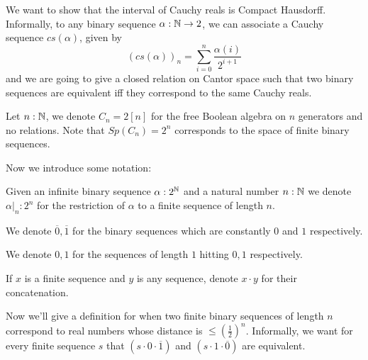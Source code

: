 We want to show that the interval of Cauchy reals is Compact Hausdorff. 
Informally, to any binary sequence $\alpha : \mathbb{N} \to 2$, 
we can associate a Cauchy sequence 
$cs(\alpha)$, given by 
\begin{equation}\label{eqnBinaryEncode}
  (cs(\alpha))_n = \sum\limits_{i = 0 }^n \frac {\alpha(i)}{2^{i+1}}
\end{equation}
and we are going to give a closed relation on Cantor space such that 
two binary sequences are equivalent iff they correspond to the same Cauchy reals. 
\begin{example}
  Let $n:\mathbb{N}$, we denote $C_n = 2[n]$ for the free Boolean algebra on $n$ generators 
  and no relations. 
  Note that $Sp(C_n) = 2^n$ corresponds to the space of finite binary sequences. 
\end{example}
Now we introduce some notation:
\begin{definition}
  \item Given an infinite binary sequence $\alpha:2^{\mathbb{N}}$ and a natural number $n : \mathbb{N}$  
    we denote $\alpha|_n: 2^n$ for the 
    restriction of $\alpha$ to a finite sequence of length $n$. 
  \item We denote $\overline 0, \overline 1$ 
    for the binary sequences which are constantly $0$ and $1$ respectively. 
  \item We denote $0,1$ for the sequences of length $1$ hitting $0,1$ respectively. 
  \item If $x$ is a finite sequence and $y$ is any sequence, 
    denote $x\cdot y$ for their concatenation. 
\end{definition} 
Now we'll give a definition for when two finite binary sequences of length $n$ correspond 
to real numbers whose distance is $\leq (\frac12)^n$.
Informally, we want for every finite sequence $s$ that 
$(s \cdot 0 \cdot \overline 1)$ and  $(s \cdot 1 \cdot \overline 0)$ are equivalent. 

